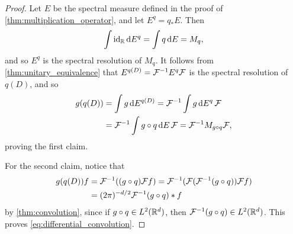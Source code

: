 \documentclass[article, a4paper, 11pt, oneside]{memoir}
\makeatletter
\numberwithin{equation}{chapter}
\theoremstyle{myexample}
\theoremstyle{myexample}
\theoremstyle{myexamplebreak}
\theoremstyle{myexamplebreak}
\theoremstyle{nonumberplain}
\newtheorem{proof}{\protect\@proof}
\theoremstyle{MyNonumberplain}
\newcommand{\@proof}{}
\renewcommand{\@proof}{Proof}%
\renewcommand{\@proof}{Bevis}%
\makeatother
\begin{document}
\begin{proof}
    Let $E$ be the spectral measure defined in the proof of \cref{thm:multiplication_operator}, and let $E^q = q_* E$. Then
    \begin{equation*}
        \int \operatorname{id}_{\mathbb{R}} \mathop{}\!\mathrm{d} E^q
            = \int q \mathop{}\!\mathrm{d} E
            = M_q,
    \end{equation*}
    and so $E^q$ is the spectral resolution of $M_q$. It follows from \cref{thm:unitary_equivalence} that $E^{q(D)} = \mathcal{F}^{-1} E^q \mathcal{F}$ is the spectral resolution of $q(D)$, and so
    \begin{align*}
        g(q(D))
            &= \int g \mathop{}\!\mathrm{d} E^{q(D)}
             = \mathcal{F}^{-1} \int g \mathop{}\!\mathrm{d} E^q \, \mathcal{F} \\
            &= \mathcal{F}^{-1} \int g \circ q \mathop{}\!\mathrm{d} E \, \mathcal{F}
             = \mathcal{F}^{-1} M_{g \circ q} \mathcal{F},
    \end{align*}
    proving the first claim.
    
    For the second claim, notice that
    \begin{align*}
        g(q(D)) f
            &= \mathcal{F}^{-1} ((g \circ q) \mathcal{F} f)
             = \mathcal{F}^{-1} (\mathcal{F} (\mathcal{F}^{-1} (g \circ q)) \mathcal{F} f) \\
            &= (2\pi)^{-d/2} \mathcal{F}^{-1} (g \circ q) * f
    \end{align*}
    by \cref{thm:convolution}, since if $g \circ q \in L^2(\mathbb{R}^d)$, then $\mathcal{F}^{-1} (g \circ q) \in L^2(\mathbb{R}^d)$. This proves \eqref{eq:differential_convolution}.
\end{proof}

\newcommand{\lebesgue}{m}
\end{document}
